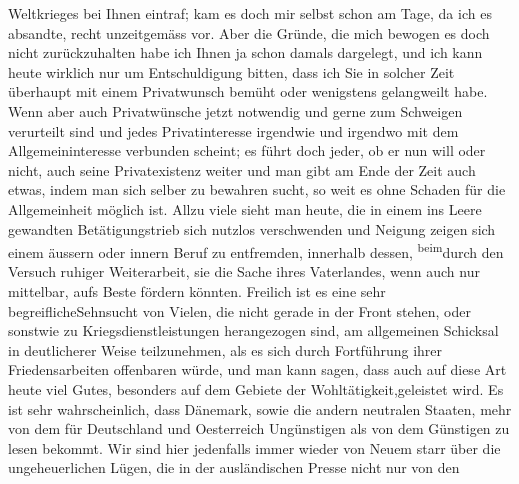 \begin{ledgroupsized}[t]{13cm}
                    Weltkrieges bei Ihnen eintraf; kam es doch mir selbst schon am Tage, da ich es
                    absandte, recht unzeitgemäss vor. Aber die Gründe, die mich bewogen es doch
                    nicht zurückzuhalten habe ich Ihnen ja 
               schon damals dargelegt\introOben{},\introOben{} und ich kann heute wirklich nur um Entschuldigung
                    bitten, dass ich Sie in solcher Zeit überhaupt mit einem Privatwunsch bemüht
                    oder wenigstens gelangweilt habe. Wenn aber auch Privatwünsche jetzt notwendig
                    und gerne zum Schweigen verurteilt sind und jedes Privatinteresse irgendwie und
                    irgendwo mit dem Allgemeininteresse verbunden scheint; es führt {\pb}doch jeder, ob er nun will oder nicht, auch
                    seine Privatexistenz weiter und man gibt am Ende der Zeit auch etwas, indem man
                    sich selber zu bewahren sucht, so weit es ohne Schaden für die Allgemeinheit
                    möglich ist. Allzu viele sieht man heute, die in einem ins Leere gewandten
                    Betätigungstrieb sich nutzlos verschwenden und Neigung zeigen sich einem äussern
                    oder innern Beruf zu entfremden, innerhalb dessen, \substVorne{}\textsuperscript{beim}\substDazwischen{}durch den\substHinten{} Versuch ruhiger Weiterarbeit, sie die Sache ihres Vaterlandes, wenn
                    auch nur mittelbar, aufs Beste fördern könnten. Freilich ist \introOben{}es eine sehr begreifliche\introOben{}Sehnsucht
                    von Vielen, die nicht gerade in der Front stehen, oder sonstwie zu
                    Kriegsdienstleistungen herangezogen sind, am allgemeinen Schicksal in
                    deutlicherer Weise teilzunehmen, als es sich durch Fortführung ihrer
                    Friedensarbeiten offenbaren würde, und man kann sagen, dass auch auf diese Art
                    heute viel Gutes, besonders auf dem Gebiete der Wohltätigkeit,geleistet
                    wird.\pend
           \pstart
           Es ist sehr wahrscheinlich, dass {\pb}Dänemark, sowie die andern neutralen Staaten,
                    mehr von dem für Deutschland und Oesterreich Ungünstigen als von dem Günstigen
                    zu lesen bekommt. Wir sind hier jedenfalls immer wieder von Neuem starr über die
                    ungeheuerlichen Lügen, die in der ausländischen Presse nicht nur von den

\end{ledgroupsized}

